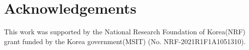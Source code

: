 \documentclass[preprint, 12pt]{elsarticle}%
\begin{document}



%







\section*{Acknowledgements}
This work was supported by the National Research Foundation of Korea(NRF) grant
funded by the Korea government(MSIT) (No. NRF-2021R1F1A1051310).

\clearpage





\end{document}

